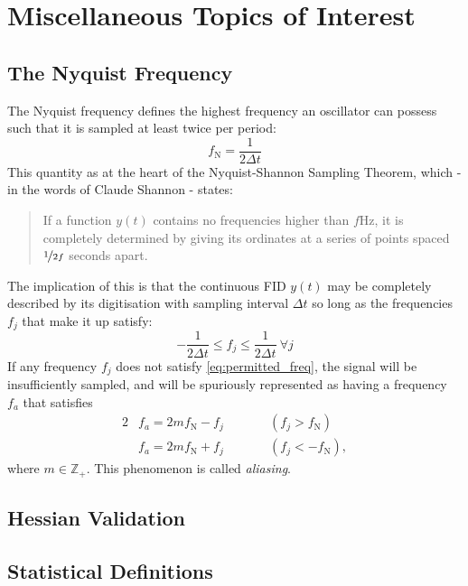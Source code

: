 \chapter{Miscellaneous Topics of Interest}
\label{chap:misc}

\section{The Nyquist Frequency}
\label{sec:nyquist}
The Nyquist frequency defines the highest frequency an oscillator can possess
such that it is sampled at least twice per period:
\begin{equation}
  f_{\mathrm{N}} = \frac{1}{2\Delta t}
\end{equation}
This quantity as at the heart of the Nyquist-Shannon Sampling Theorem, which -
in the words of Claude Shannon\cite{Shannon1949} - states:
\begin{quote}
  If a function $y(t)$ contains no frequencies
  higher than $f \si{\hertz}$, it is completely determined by giving
  its ordinates at a series of points spaced $\nicefrac{1}{2f}$ seconds
  apart.
\end{quote}
The implication of this is that the continuous FID $y(t)$ may be completely
described by its digitisation with sampling interval $\Delta t$ so long as the
frequencies $f_j$ that make it up satisfy:
\begin{equation}
  \label{permitted_freq}
  -\frac{1}{2\Delta t} \leq f_j \leq \frac{1}{2\Delta t}\ \forall j
\end{equation}
If any frequency $f_j$ does not satisfy \eqref{eq:permitted_freq}, the signal
will be insufficiently sampled, and will be spuriously represented as having a
frequency $f_a$ that satisfies
\begin{alignat}{2}
  &f_a = 2mf_{\mathrm{N}} - f_j \quad \quad &&(f_j > f_{\mathrm{N}})\\
  &f_a = 2mf_{\mathrm{N}} + f_j \quad \quad &&(f_j < -f_{\mathrm{N}}),
\end{alignat}
where $m \in \mathbb{Z}_+$. This phenomenon is called \textit{aliasing}.

\section{Hessian Validation}

\section{Statistical Definitions}

